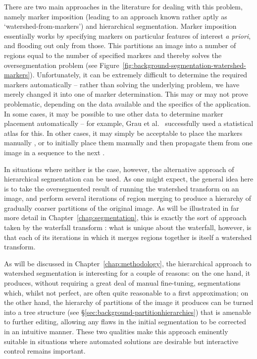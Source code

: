 
There are two main approaches in the literature for dealing with this problem, namely marker imposition (leading to an approach known rather aptly as `watershed-from-markers') and hierarchical segmentation. Marker imposition essentially works by specifying markers on particular features of interest \emph{a priori}, and flooding out only from those. This partitions an image into a number of regions equal to the number of specified markers and thereby solves the oversegmentation problem (see Figure~\ref{fig:background-segmentation-watershed-markers}). Unfortunately, it can be extremely difficult to determine the required markers automatically -- rather than solving the underlying problem, we have merely changed it into one of marker determination. This may or may not prove problematic, depending on the data available and the specifics of the application. In some cases, it may be possible to use other data to determine marker placement automatically -- for example, Grau et al.\ \cite{grau04} successfully used a statistical atlas for this. In other cases, it may simply be acceptable to place the markers manually \cite{xue05}, or to initially place them manually and then propagate them from one image in a sequence to the next \cite{flores09}.


In situations where neither is the case, however, the alternative approach of hierarchical segmentation can be used. As one might expect, the general idea here is to take the oversegmented result of running the watershed transform on an image, and perform several iterations of region merging to produce a hierarchy of gradually coarser partitions of the original image. As will be illustrated in far more detail in Chapter~\ref{chap:segmentation}, this is exactly the sort of approach taken by the waterfall transform \cite{beucher90,marcotegui05}: what is unique about the waterfall, however, is that each of its iterations in which it merges regions together is itself a watershed transform.

As will be discussed in Chapter~\ref{chap:methodology}, the hierarchical approach to watershed segmentation is interesting for a couple of reasons: on the one hand, it produces, without requiring a great deal of manual fine-tuning, segmentations which, whilst not perfect, are often quite reasonable to a first approximation; on the other hand, the hierarchy of partitions of the image it produces can be turned into a tree structure (see \S\ref{sec:background-partitionhierarchies}) that is amenable to further editing, allowing any flaws in the initial segmentation to be corrected in an intuitive manner. These two qualities make this approach eminently suitable in situations where automated solutions are desirable but interactive control remains important.


